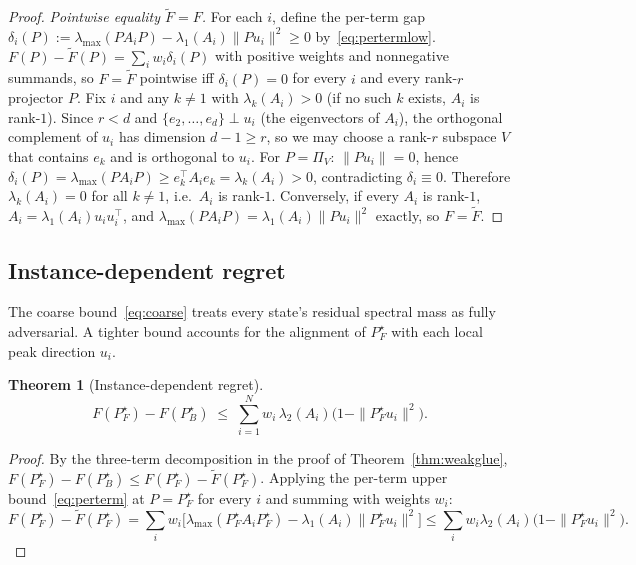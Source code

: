 \documentclass[final,3p,times]{elsarticle}
\newtheorem{theorem}{Theorem}
\begin{document}
\begin{proof}
\emph{Pointwise equality $\tilde F=F$.}
For each $i$, define the per-term gap
$\delta_i(P):=\lambda_{\max}(PA_iP)-\lambda_1(A_i)\|Pu_i\|^2\ge 0$
by~\eqref{eq:pertermlow}.
$F(P)-\tilde F(P)=\sum_i w_i\delta_i(P)$ with positive weights and
nonnegative summands, so $F=\tilde F$ pointwise iff $\delta_i(P)=0$ for
every $i$ and every rank-$r$ projector $P$.
Fix $i$ and any $k\ne 1$ with $\lambda_k(A_i)>0$ (if no such $k$
exists, $A_i$ is rank-$1$).
Since $r<d$ and $\{e_2,\ldots,e_d\}\perp u_i$ (the eigenvectors of
$A_i$), the orthogonal complement of $u_i$ has dimension $d-1\ge r$,
so we may choose a rank-$r$ subspace $V$ that contains $e_k$ and is
orthogonal to $u_i$.
For $P=\Pi_V$: $\|Pu_i\|=0$, hence $\delta_i(P)
=\lambda_{\max}(PA_iP)\ge e_k^\top A_i e_k=\lambda_k(A_i)>0$,
contradicting $\delta_i\equiv 0$.
Therefore $\lambda_k(A_i)=0$ for all $k\ne 1$, i.e.\ $A_i$ is rank-$1$.
Conversely, if every $A_i$ is rank-$1$, $A_i=\lambda_1(A_i)u_iu_i^\top$,
and $\lambda_{\max}(PA_iP)=\lambda_1(A_i)\|Pu_i\|^2$ exactly, so $F=\tilde F$.
\end{proof}

\subsection{Instance-dependent regret}

The coarse bound~\eqref{eq:coarse} treats every state's residual
spectral mass as fully adversarial.
A tighter bound accounts for the alignment of $P_F^\star$ with each
local peak direction $u_i$.

\begin{theorem}[Instance-dependent regret]\label{thm:instancereg}
\begin{equation}\label{eq:instreg}
F(P_F^\star)-F(P_B^\star)
\;\le\;
\sum_{i=1}^N w_i\,\lambda_2(A_i)\bigl(1-\|P_F^\star u_i\|^2\bigr).
\end{equation}
\end{theorem}

\begin{proof}
By the three-term decomposition in the proof of
Theorem~\ref{thm:weakglue}, $F(P_F^\star)-F(P_B^\star)\le
F(P_F^\star)-\tilde F(P_F^\star)$.
Applying the per-term upper bound~\eqref{eq:perterm} at $P=P_F^\star$ for
every $i$ and summing with weights $w_i$:
\[
F(P_F^\star)-\tilde F(P_F^\star)
=\sum_i w_i\bigl[\lambda_{\max}(P_F^\star A_i P_F^\star)-\lambda_1(A_i)\|P_F^\star u_i\|^2\bigr]
\le\sum_i w_i\lambda_2(A_i)\bigl(1-\|P_F^\star u_i\|^2\bigr).
\]
\end{proof}
\end{document}
